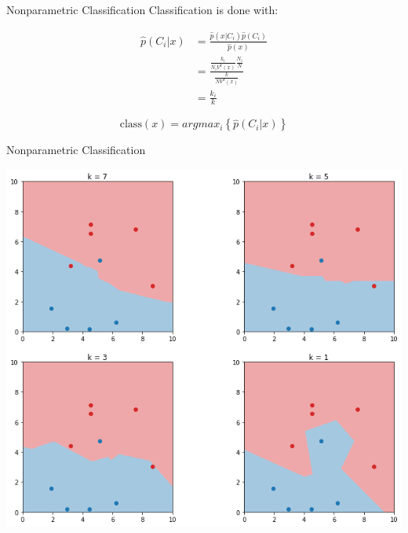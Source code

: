 \documentclass{beamer}
\begin{document}
\begin{frame}[fragile]{Nonparametric Classification}
	Classification is done with:
  
  \begin{align}
    \hat p(C_i | x) &= \frac{\hat p(x|C_i) \hat p(C_i)}{\hat p(x)}\\
                    &= \frac{\frac{k_{i}}{N_{i}V^{k}(x)}\frac{N_i}{N}}{\frac{k}{NV^{k}(x)}} \\
                    &= \frac{k_i}{k}
  \end{align}
  
  \begin{equation}
    \text{class}(x) = argmax_i \left \{\hat p(C_i | x) \right \}
  \end{equation}
\end{frame}

\begin{frame}[fragile]{Nonparametric Classification}
\begin{center}
  \includegraphics[height=0.9\textheight]{images/classification_knn.png}
\end{center}
\end{frame}
\end{document}
